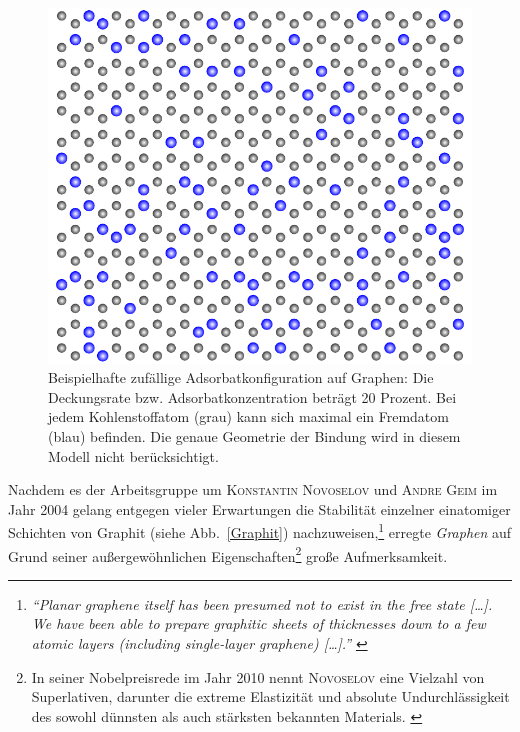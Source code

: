 \documentclass[a4paper, 10pt, twoside, openany]{book} %
\begin{document}
\begin{figure}[t]
\begin{minipage}[b]{0.5\textwidth}
        \includegraphics[width=\textwidth]{Abbildungen/random20.pdf}
        \caption[Beispielhafte zufällige Adsorbatkonfiguration auf Graphen]{Beispielhafte zufällige Adsorbatkonfiguration auf Graphen: Die Deckungsrate bzw. Adsorbatkonzentration beträgt 20 Prozent. Bei jedem Kohlenstoffatom (grau) kann sich maximal ein Fremdatom (blau) befinden. Die genaue Geometrie der Bindung wird in diesem Modell nicht berücksichtigt.}
        \label{random20}
    \end{minipage}
\end{figure}
%
Nachdem es der Arbeitsgruppe um \textsc{Konstantin Novoselov} und \textsc{Andre Geim} im Jahr 2004 gelang entgegen vieler Erwartungen die Stabilität einzelner einatomiger Schichten von Graphit (siehe Abb.~\ref{Graphit}) nachzuweisen,\footnote{\emph{"`Planar graphene itself has been presumed not to exist in the free state \emph{[\dots]}. We have been able to prepare graphitic sheets of thicknesses down to a few atomic layers (including single-layer graphene) \emph{[\dots]}."'} \cite[S.~666f]{Novoselov1}} erregte \emph{Graphen} auf Grund seiner außergewöhnlichen Eigenschaften\footnote{In seiner Nobelpreisrede im Jahr 2010 nennt \textsc{Novoselov} eine Vielzahl von Superlativen, darunter die extreme Elastizität und absolute Undurchlässigkeit des sowohl dünnsten als auch stärksten bekannten Materials. \cite[S.~107]{Novoselov2}} große Aufmerksamkeit.
\end{document}
